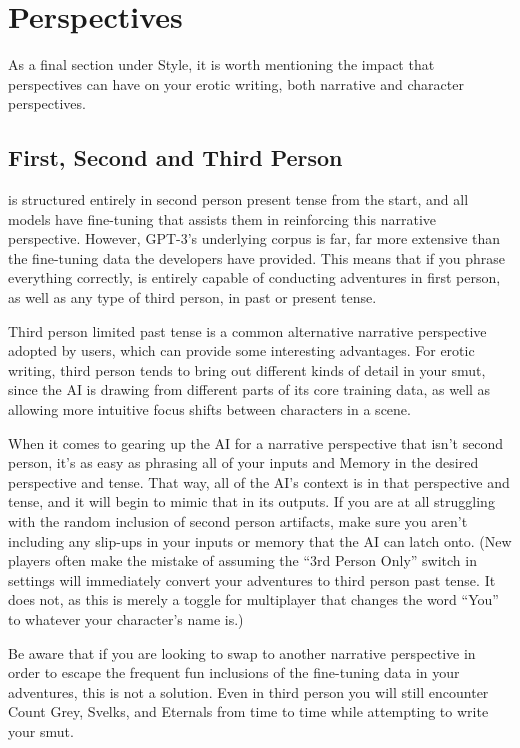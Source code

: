 ﻿\documentclass[Coomer-main.tex]{subfiles}
\begin{document}
\section{Perspectives}

As a final section under Style, it is worth mentioning the impact that perspectives can have on your erotic writing, both narrative and character perspectives.

\subsection{First, Second and Third Person}

\aid is structured entirely in second person present tense from the start, and all models have fine-tuning that assists them in reinforcing this narrative perspective. However, GPT-3's underlying corpus is far, far more extensive than the fine-tuning data the developers have provided. This means that if you phrase everything correctly, \aid is entirely capable of conducting adventures in first person, as well as any type of third person, in past or present tense.

Third person limited past tense is a common alternative narrative perspective adopted by \aid users, which can provide some interesting advantages. For erotic writing, third person tends to bring out different kinds of detail in your smut, since the AI is drawing from different parts of its core training data, as well as allowing more intuitive focus shifts between characters in a scene.

When it comes to gearing up the AI for a narrative perspective that isn't second person, it's as easy as phrasing all of your inputs and Memory in the desired perspective and tense. That way, all of the AI's context is in that perspective and tense, and it will begin to mimic that in its outputs. If you are at all struggling with the random inclusion of second person artifacts, make sure you aren't including any slip-ups in your inputs or memory that the AI can latch onto. (New players often make the mistake of assuming the “3rd Person Only” switch in settings will immediately convert your adventures to third person past tense. It does not, as this is merely a toggle for multiplayer that changes the word “You” to whatever your character’s name is.)

Be aware that if you are looking to swap to another narrative perspective in order to escape the frequent fun inclusions of the fine-tuning data in your adventures, this is not a solution. Even in third person you will still encounter Count Grey, Svelks, and Eternals from time to time while attempting to write your smut.
\end{document}
